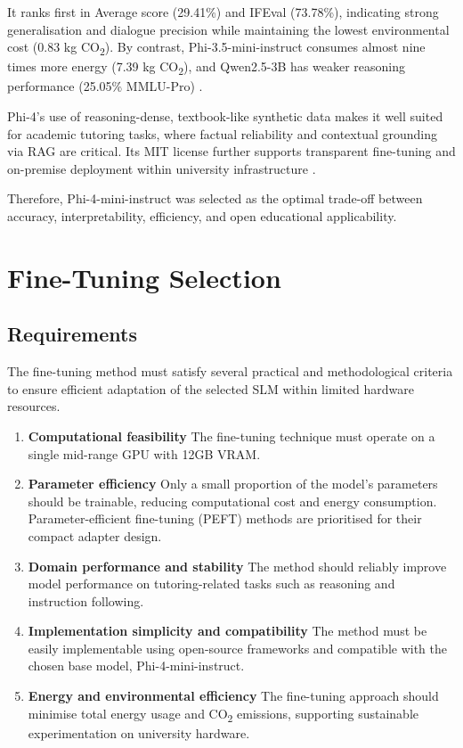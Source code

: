 It ranks first in Average score (29.41\%) and IFEval (73.78\%), indicating strong generalisation and dialogue precision while maintaining the lowest environmental cost (0.83 kg CO\textsubscript{2}). By contrast, Phi-3.5-mini-instruct consumes almost nine times more energy (7.39 kg CO\textsubscript{2}), and Qwen2.5-3B has weaker reasoning performance (25.05\% MMLU-Pro) \parencite{HuggingFaceLeaderboard2025}.

Phi-4’s use of reasoning-dense, textbook-like synthetic data makes it well suited for academic tutoring tasks, where factual reliability and contextual grounding via RAG are critical. Its MIT license further supports transparent fine-tuning and on-premise deployment within university infrastructure \parencite{microsof61:online,Empoweri69:online}.

Therefore, Phi-4-mini-instruct was selected as the optimal trade-off between accuracy, interpretability, efficiency, and open educational applicability.

\section{Fine-Tuning Selection}

\subsection{Requirements}

The fine-tuning method must satisfy several practical and methodological criteria to ensure efficient adaptation of the selected SLM within limited hardware resources.

\begin{enumerate}
    \item \textbf{Computational feasibility}  
    The fine-tuning technique must operate on a single mid-range GPU with 12GB VRAM.

    \item \textbf{Parameter efficiency}  
    Only a small proportion of the model’s parameters should be trainable, reducing computational cost and energy consumption. Parameter-efficient fine-tuning (PEFT) methods are prioritised for their compact adapter design.

    \item \textbf{Domain performance and stability}  
    The method should reliably improve model performance on tutoring-related tasks such as reasoning and instruction following.

    \item \textbf{Implementation simplicity and compatibility}  
    The method must be easily implementable using open-source frameworks and compatible with the chosen base model, Phi-4-mini-instruct.

    \item \textbf{Energy and environmental efficiency}  
    The fine-tuning approach should minimise total energy usage and CO\textsubscript{2} emissions, supporting sustainable experimentation on university hardware.
\end{enumerate}

